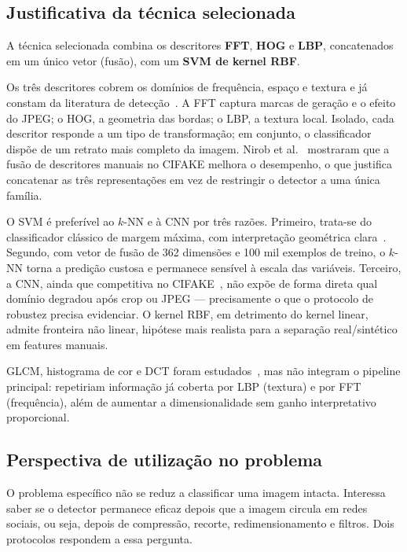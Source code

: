 \documentclass[12pt]{article}
\begin{document}
\subsection{Justificativa da técnica selecionada}

A técnica selecionada combina os descritores \textbf{FFT}, \textbf{HOG} e \textbf{LBP}, concatenados em um único vetor (fusão), com um \textbf{SVM de kernel RBF}.

Os três descritores cobrem os domínios de frequência, espaço e textura e já constam da literatura de detecção~\cite{frank2020frequency,bammey2024synthbuster,nirob2026handcrafted,dalal2005hog,ojala2002lbp}. A FFT captura marcas de geração e o efeito do JPEG; o HOG, a geometria das bordas; o LBP, a textura local. Isolado, cada descritor responde a um tipo de transformação; em conjunto, o classificador dispõe de um retrato mais completo da imagem. Nirob et al.~\cite{nirob2026handcrafted} mostraram que a fusão de descritores manuais no CIFAKE melhora o desempenho, o que justifica concatenar as três representações em vez de restringir o detector a uma única família.

O SVM é preferível ao $k$-NN e à CNN por três razões. Primeiro, trata-se do classificador clássico de margem máxima, com interpretação geométrica clara~\cite{cortes1995svm}. Segundo, com vetor de fusão de 362 dimensões e 100 mil exemplos de treino, o $k$-NN torna a predição custosa e permanece sensível à escala das variáveis. Terceiro, a CNN, ainda que competitiva no CIFAKE~\cite{bird2024cifake}, não expõe de forma direta qual domínio degradou após crop ou JPEG --- precisamente o que o protocolo de robustez precisa evidenciar. O kernel RBF, em detrimento do kernel linear, admite fronteira não linear, hipótese mais realista para a separação real/sintético em features manuais.

GLCM, histograma de cor e DCT foram estudados~\cite{nirob2026handcrafted,gonzalez2018}, mas não integram o pipeline principal: repetiriam informação já coberta por LBP (textura) e por FFT (frequência), além de aumentar a dimensionalidade sem ganho interpretativo proporcional.

\subsection{Perspectiva de utilização no problema}

O problema específico não se reduz a classificar uma imagem intacta. Interessa saber se o detector permanece eficaz depois que a imagem circula em redes sociais, ou seja, depois de compressão, recorte, redimensionamento e filtros. Dois protocolos respondem a essa pergunta.
\end{document}
